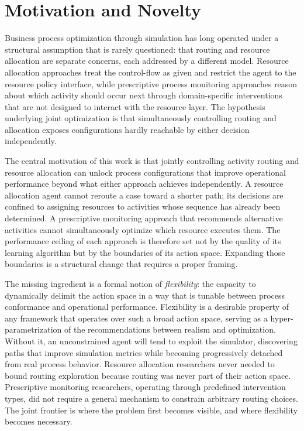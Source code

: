 \documentclass[journal,onecolumn]{IEEEtran}
\begin{document}
\section{Motivation and Novelty}
\label{sec:motivation_and_novelty}

Business process optimization through simulation has long operated
under a structural assumption that is rarely questioned: that routing
and resource allocation are separate concerns, each addressed by a
different model. Resource allocation approaches treat the control-flow
as given and restrict the agent to the resource policy interface,
while prescriptive process monitoring approaches reason about which
activity should occur next through domain-specific interventions that
are not designed to interact with the resource layer. The hypothesis underlying
joint optimization is that simultaneously controlling routing and allocation
exposes configurations hardly reachable by either decision independently.

The central motivation of this work is that jointly controlling
activity routing and resource allocation can unlock process
configurations that improve operational performance beyond what
either approach achieves independently. A resource allocation agent
cannot reroute a case toward a shorter path; its decisions are
confined to assigning resources to activities whose sequence has
already been determined. A prescriptive monitoring approach that
recommends alternative activities cannot simultaneously optimize
which resource executes them. The performance ceiling of each
approach is therefore set not by the quality of its learning
algorithm but by the boundaries of its action space. Expanding
those boundaries is a structural change that requires a proper framing.

The missing ingredient is a formal notion of \emph{flexibility}:
the capacity to dynamically delimit the action space in a way that
is tunable between process conformance and operational performance.
Flexibility is a desirable property of any framework that operates
over such a broad action space, serving as a hyper-parametrization
of the recommendations between realism and optimization. Without it,
an unconstrained agent will tend to exploit the simulator, discovering
paths that improve simulation metrics while becoming progressively
detached from real process behavior. Resource allocation researchers
never needed to bound routing exploration because routing was never
part of their action space. Prescriptive monitoring researchers,
operating through predefined intervention types, did not require a
general mechanism to constrain arbitrary routing choices. The joint
frontier is where the problem first becomes visible, and where
flexibility becomes necessary.
\end{document}

